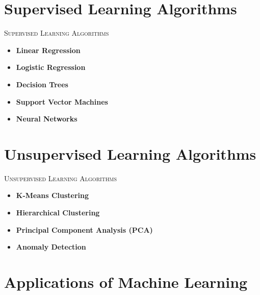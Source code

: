 \documentclass[compress]{beamer}
\begin{document}
\section[Supervised]{Supervised Learning Algorithms}

\begin{frame}{\textsc{Supervised Learning Algorithms}}
  \begin{itemize}
    \item \textbf{Linear Regression}
    \item \textbf{Logistic Regression}
    \item \textbf{Decision Trees}
    \item \textbf{Support Vector Machines}
    \item \textbf{Neural Networks}
  \end{itemize}
\end{frame}

\section[Unsupervised]{Unsupervised Learning Algorithms}

\begin{frame}{\textsc{Unsupervised Learning Algorithms}}
  \begin{itemize}
    \item \textbf{K-Means Clustering}
    \item \textbf{Hierarchical Clustering}
    \item \textbf{Principal Component Analysis (PCA)}
    \item \textbf{Anomaly Detection}
  \end{itemize}
\end{frame}

\section[Applications]{Applications of Machine Learning}
\end{document}
